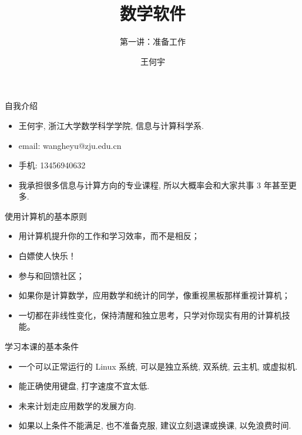 \documentclass{beamer}
\title[MS2023] %
{\Huge 数学软件}
\subtitle
{第一讲：准备工作} %
\author[Wang HY] %
{王何宇}
\institute[Zhejiang University] %
{
  浙江大学数学科学学院\\
  计算数学系
}
\date[Short Occasion] %
{}
\begin{document}
\begin{frame}
 \titlepage
\end{frame}

\begin{frame}{自我介绍}
  \begin{itemize}
  \item 王何宇, 浙江大学数学科学学院, 信息与计算科学系.
  \item email: wangheyu@zju.edu.cn
  \item 手机: 13456940632
  \item 我承担很多信息与计算方向的专业课程, 所以大概率会和大家共事 3 年甚至更多.
  \end{itemize}
\end{frame}

\begin{frame}{使用计算机的基本原则}
  \begin{itemize}
  \item<1-> 用计算机提升你的工作和学习效率，而不是相反；
  \item<2-> 白嫖使人快乐！ 
  \item<3-> 参与和回馈社区；
  \item<4-> 如果你是计算数学，应用数学和统计的同学，像重视黑板那样重视计算机；
  \item<5-> 一切都在非线性变化，保持清醒和独立思考，只学对你现实有用的计算机技能。
  \end{itemize}
\end{frame}

\begin{frame}{学习本课的基本条件}
  \begin{itemize}
  \item<1-> 一个可以正常运行的 Linux 系统, 可以是独立系统, 双系统, 云主机, 或虚拟机.
  \item<2-> 能正确使用键盘, 打字速度不宜太低.
  \item<3-> 未来计划走应用数学的发展方向.
  \item<4-> 如果以上条件不能满足, 也不准备克服, 建议立刻退课或换课, 以免浪费时间.
  \end{itemize}
\end{frame}
\end{document}
